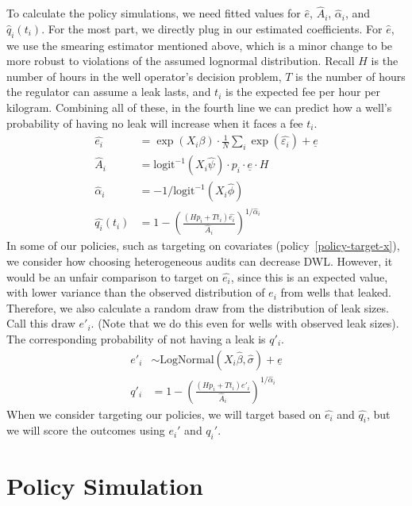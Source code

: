 \documentclass[12pt,oneside,letterpaper]{article}
\theoremstyle{definition}
\begin{document}
\begin{refsection}
To calculate the policy simulations, we need fitted values for \(\hat{e}\), \(\hat{A}_i\), \(\hat{\alpha}_i\), and \(\hat{q}_i(t_i)\).
For the most part, we directly plug in our estimated coefficients.
For \(\hat{e}\), we use the smearing estimator mentioned above, which is a minor change to be more robust to violations of the assumed lognormal distribution.
Recall \(H\) is the number of hours in the well operator's decision problem, \(T\) is the number of hours the regulator can assume a leak lasts, and \(t_i\) is the expected fee per hour per kilogram.
Combining all of these, in the fourth line we can predict how a well's probability of having no leak will increase when it faces a fee \(t_i\).
\begin{align*}
\hat{e_i} &= \exp( X_i \beta) \cdot \frac{1}{N}\sum_i \exp(\hat{\varepsilon_i}) + \underline{e}\\
\hat{A}_i &= \text{logit}^{-1}(X_i \hat{\psi}) \cdot p_i \cdot \underline{e} \cdot H\\
\hat{\alpha}_i &= -1 / \text{logit}^{-1}(X_i \hat{\phi})\\
\hat{q_i}(t_i) &= 1 - \left(\frac{(H p_i + T t_i) \hat{e_i}}{\hat{A}_i}\right) ^{1 / \hat{\alpha}_i}
\end{align*}
In some of our policies, such as targeting on covariates (policy~\ref{policy-target-x}), we consider how choosing heterogeneous audits can decrease \gls{DWL}.
However, it would be an unfair comparison to target on \(\hat{e_i}\), since this is an expected value, with lower variance than the observed distribution of \(e_i\) from wells that leaked.
Therefore, we also calculate a random draw from the distribution of leak sizes.
Call this draw \(e'_i\).
(Note that we do this even for wells with observed leak sizes).
The corresponding probability of not having a leak is \(q'_i\).
\begin{align*}
e'_i &\sim \text{LogNormal}(X_i \hat{\beta}, \hat{\sigma}) + \underline{e} \\
q'_i &= 1 - \left(\frac{(H p_i + T t_i) e'_i}{\hat{A}_i}\right) ^{1 / \hat{\alpha}_i}
\end{align*}
When we consider targeting our policies, we will target based on \(\hat{e_i} \) and \(\hat{q_i}\), but we will score the outcomes using \(e_i'\) and \(q_i'\).



\section{Policy Simulation}
\label{sec:policy-simulation}


\end{refsection}
\end{document}
